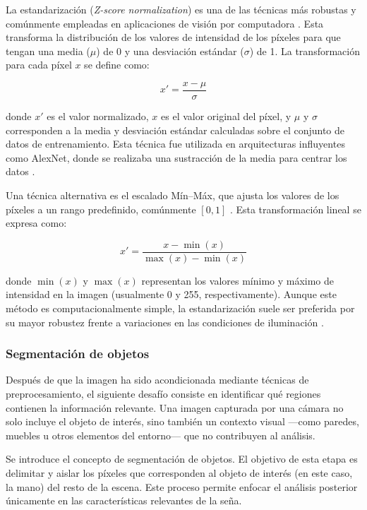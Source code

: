 	La estandarización (\textit{Z-score normalization}) es una de las técnicas más robustas y comúnmente empleadas en aplicaciones de visión por computadora \cite{bishop2006}. Esta transforma la distribución de los valores de intensidad de los píxeles para que tengan una media ($\mu$) de 0 y una desviación estándar ($\sigma$) de 1. La transformación para cada píxel $x$ se define como:
	
	\begin{equation}
		x' = \frac{x - \mu}{\sigma}
	\end{equation}
	
	donde $x'$ es el valor normalizado, $x$ es el valor original del píxel, y $\mu$ y $\sigma$ corresponden a la media y desviación estándar calculadas sobre el conjunto de datos de entrenamiento. Esta técnica fue utilizada en arquitecturas influyentes como AlexNet, donde se realizaba una sustracción de la media para centrar los datos \cite{krizhevsky2012}.
	
	Una técnica alternativa es el escalado Mín–Máx, que ajusta los valores de los píxeles a un rango predefinido, comúnmente $[0,1]$ \cite{bishop2006}. Esta transformación lineal se expresa como:
	
	\begin{equation}
		x' = \frac{x - \min(x)}{\max(x) - \min(x)}
	\end{equation}
	
	donde $\min(x)$ y $\max(x)$ representan los valores mínimo y máximo de intensidad en la imagen (usualmente 0 y 255, respectivamente). Aunque este método es computacionalmente simple, la estandarización suele ser preferida por su mayor robustez frente a variaciones en las condiciones de iluminación \cite{goodfellow2016}.
	
	
	\subsubsection{Segmentación de objetos}
	
	Después de que la imagen ha sido acondicionada mediante técnicas de preprocesamiento, el siguiente desafío consiste en identificar qué regiones contienen la información relevante. Una imagen capturada por una cámara no solo incluye el objeto de interés, sino también un contexto visual —como paredes, muebles u otros elementos del entorno— que no contribuyen al análisis.
	
	Se introduce el concepto de segmentación de objetos. El objetivo de esta etapa es delimitar y aislar los píxeles que corresponden al objeto de interés (en este caso, la mano) del resto de la escena. Este proceso permite enfocar el análisis posterior únicamente en las características relevantes de la seña.
	
